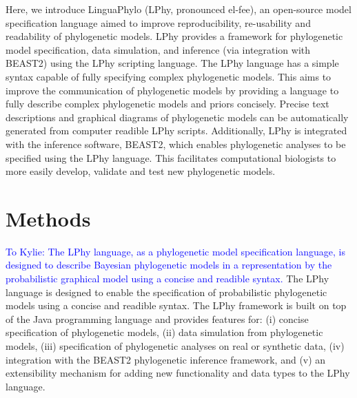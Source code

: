 \documentclass[10pt,letterpaper,table]{article}
\begin{document}
Here, we introduce LinguaPhylo (LPhy, pronounced el-fee), an open-source model specification 
language aimed to improve reproducibility, re-usability and readability of phylogenetic models. 
LPhy provides a framework for phylogenetic model specification, data simulation, and inference (via integration with BEAST2) using the LPhy scripting language. 
The LPhy language has a simple syntax capable of fully specifying complex phylogenetic models. 
This aims to improve the communication of phylogenetic models by providing a language %
to fully describe complex phylogenetic models and priors concisely. 
Precise text descriptions and graphical diagrams of phylogenetic models can be automatically generated from computer readible LPhy scripts.  
Additionally, LPhy is integrated with the inference software, BEAST2, which enables phylogenetic analyses to be specified using the LPhy language. 
This facilitates computational biologists to more easily develop, validate and test new phylogenetic models. 


\section{Methods}
\textcolor{blue}{To Kylie: The LPhy language, as a phylogenetic model specification language, is designed to describe Bayesian phylogenetic models in a representation by the probabilistic graphical model using a concise and readible syntax.}
The LPhy language is designed to enable the specification of probabilistic phylogenetic models using a concise and readible syntax.  
The LPhy framework is built on top of the Java programming language and provides features for: 
(i) concise specification of phylogenetic models, (ii) data simulation from phylogenetic models, (iii) specification of phylogenetic analyses on real or synthetic data, (iv) integration with the BEAST2 phylogenetic inference framework, and (v) an extensibility mechanism for adding new functionality and data types to the LPhy language.
 
\end{document}
